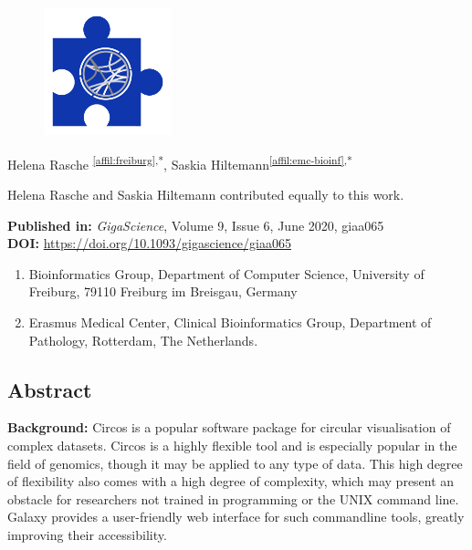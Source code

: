 \cleartorightpage
\setcounter{NAT@ctr}{-1}
\chapter*{}

\begin{figure}[t!]
\centering
\includegraphics[height=10em]{frontmatter/images/chapter-header-circos.png}
\end{figure}
\vspace{-4cm}



Helena Rasche \textsuperscript{\ref{affil:freiburg},*},
Saskia Hiltemann\textsuperscript{\ref{affil:emc-bioinf},*}

{\color{chaptergrey}{*}} Helena Rasche and Saskia Hiltemann contributed equally to this work.

\textbf{Published in:} \emph{GigaScience}, Volume 9, Issue 6, June 2020, giaa065 \\
\textbf{DOI:} \url{https://doi.org/10.1093/gigascience/giaa065}

\small
\begin{enumerate}
 \itemsep-0.5em
 \item Bioinformatics Group, Department of Computer Science, University of Freiburg, 79110 Freiburg im Breisgau, Germany\label{affil:freiburg}
 \item Erasmus Medical Center, Clinical Bioinformatics Group, Department of Pathology, Rotterdam, The Netherlands.\label{affil:emc-bioinf}
\end{enumerate}



\section*{Abstract}

\textbf{Background:} Circos is a popular software package for circular visualisation of complex datasets. Circos is a highly flexible tool and is especially popular in the field of genomics, though it may be applied to any type of data. This high degree of flexibility also comes with a high degree of complexity, which may present an obstacle for researchers not trained in programming or the UNIX command line. Galaxy provides a user-friendly web interface for such commandline tools, greatly improving their accessibility.

